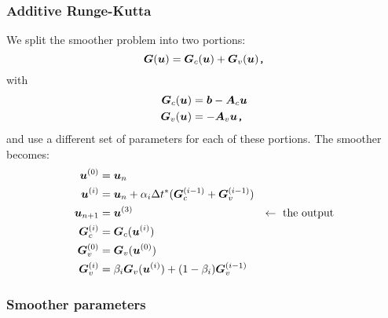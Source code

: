 \documentclass{article}
\newcommand{\todo}[1]{\textcolor{blue}{#1}}
\begin{document}


\subsubsection{Additive Runge-Kutta}

We split the smoother problem into two portions:
\begin{equation}
    \bm{G}(\bm{u}) = \bm{G}_c(\bm{u}) + \bm{G}_v(\bm{u})
    \texttt{,}
\end{equation}
with
\begin{align}
    \bm{G}_c(\bm{u}) &= \bm{b} - \bm{A}_c\bm{u} \\
    \bm{G}_v(\bm{u}) &= -\bm{A}_v\bm{u}
    \texttt{,}
\end{align}
and use a different set of parameters for each of these portions.
The smoother becomes:
\begin{subequations}
\begin{align}
    \bm{u}^{(0)}        &= \bm{u}_{n} \\
    \bm{u}^{(i)}        &= \bm{u}_{n} + \alpha_i\Delta t^*(\bm{G}_c^{(i-1)} + \bm{G}_v^{(i-1)})  \\
    \bm{u}_{n+1}        &= \bm{u}^{(3)} & \leftarrow \text{ the output}\\
    \bm{G}_c^{(i)} &= \bm{G}_c(\bm{u}^{(i)}) \\
    \bm{G}_v^{(0)} &= \bm{G}_v(\bm{u}^{(0)}) \\
    \bm{G}_v^{(i)} &= \beta_i\bm{G}_v(\bm{u}^{(i)}) + (1 - \beta_i) \bm{G}_v^{(i-1)}
\end{align}
\end{subequations}

\subsubsection{Smoother parameters}
\end{document}
